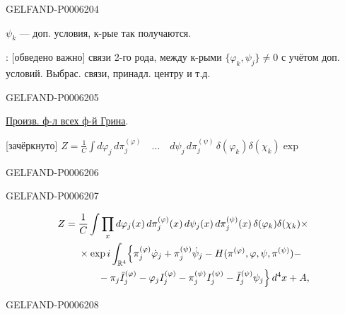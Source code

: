 \begin{GelfandAdjacentEvidence}{GELFAND-P000620}{4}

\(\psi_k\) — доп. условия, к-рые так получаются.

: [обведено важно] связи 2-го рода, между к-рыми
\(\{\varphi_k,\psi_j\}\ne0\) с учётом доп. условий.
Выбрас. связи, принадл. центру и т.д.
\end{GelfandAdjacentEvidence}
\begin{GelfandAdjacentEvidence}{GELFAND-P000620}{5}


\underline{Произв. ф-л всех ф-й Грина}.
\begin{center}
[зачёркнуто]
\sout{\(Z=\frac1C\int d\varphi_j\,d\pi_j^{(\varphi)}
\quad\ldots\quad d\psi_j\,d\pi_j^{(\psi)}
\,\delta(\varphi_k)\delta(\chi_k)\exp\)}
\end{center}
\end{GelfandAdjacentEvidence}
\begin{GelfandAdjacentEvidence}{GELFAND-P000620}{6}

\end{GelfandAdjacentEvidence}
\begin{GelfandAdjacentEvidence}{GELFAND-P000620}{7}

\[
\begin{aligned}
Z={}&\frac1C\int\prod_x d\varphi_j(x)\,d\pi_j^{(\varphi)}(x)\,
d\psi_j(x)\,d\pi_j^{(\psi)}(x)\,\delta(\varphi_k)\delta(\chi_k)\times\\
&\times\exp i\int_{\mathbb R^4}\Bigl\{
\pi_j^{(\varphi)}\dot\varphi_j+\pi_j^{(\psi)}\dot\psi_j
-H(\pi^{(\varphi)},\varphi,\psi,\pi^{(\psi)})-\\
&\qquad-\pi_j\bar I_j^{(\varphi)}-\varphi_j I_j^{(\varphi)}
-\pi_j^{(\psi)} I_j^{(\psi)}
-\bar I_j^{(\psi)}\psi_j\Bigr\}\,d^4x+A,
\end{aligned}
\]
\end{GelfandAdjacentEvidence}
\begin{GelfandAdjacentEvidence}{GELFAND-P000620}{8}

\end{GelfandAdjacentEvidence}
